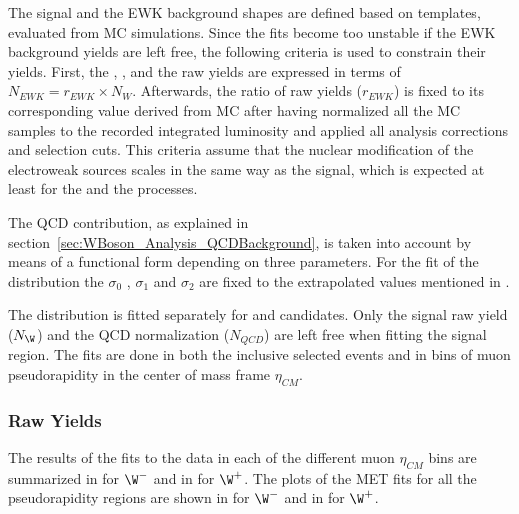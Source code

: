 The signal and the EWK background shapes are defined based on \ETslash templates, evaluated from MC simulations. Since the fits become too unstable if the EWK background yields are left free, the following criteria is used to constrain their yields. First, the \DYToMuMu , \WToTauNu, \DYToTauTau and the \ttbar raw yields are expressed in terms of $N_{EWK} = r_{EWK}\times N_{W}$. Afterwards, the ratio of raw yields ($r_{EWK}$) is fixed to its corresponding value derived from MC after having normalized all the MC samples to the recorded integrated luminosity and applied all analysis corrections and selection cuts. This criteria assume that the nuclear modification of the electroweak sources scales in the same way as the \W signal, which is expected at least for the \WToTauNu and the \DY processes.

The QCD contribution, as explained in section~\ref{sec:WBoson_Analysis_QCDBackground}, is taken into account by means of a functional form depending on three parameters. For the fit of the \ETslash distribution the $\sigma_{0}$ , $\sigma_{1}$ and $\sigma_{2}$ are fixed to the extrapolated values mentioned in .

The \ETslash distribution is fitted separately for \WToMuNuPl and \WToMuNuMi candidates. Only the signal raw yield ($N_{\W}$) and the QCD normalization ($N_{QCD}$) are left free when fitting the \W signal region. The fits are done in both the inclusive selected events and in bins of muon pseudorapidity in the center of mass frame $\eta_{CM}$.


\subsubsection{Raw Yields}


The results of the fits to the data in each of the different muon $\eta_{CM}$ bins are summarized in  for $\W^{-}$ and in  for $\W^{+}$. The plots of the MET fits for all the pseudorapidity regions are shown in  for $\W^{-}$ and in  for $\W^{+}$.




